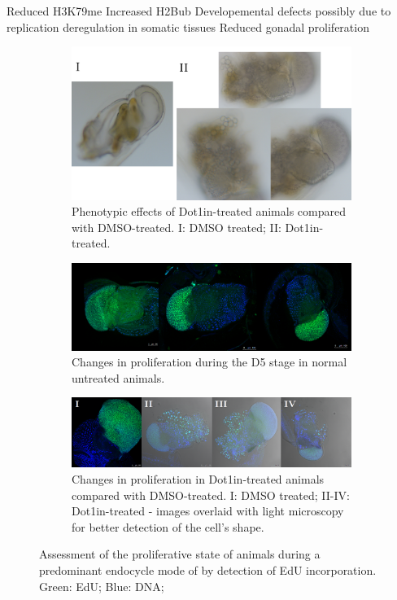 \documentclass[11pt,twoside,a4paper]{report}
\begin{document}
	Reduced H3K79me
	Increased H2Bub
	Developemental defects possibly due to replication deregulation in somatic tissues
	Reduced gonadal proliferation

	\begin{figure}
		\centering
		\begin{subfigure}{0.8\textwidth}
			\centering
			\includegraphics[width=1\linewidth]{pngs/d5_phenotype.png}
			\caption{
				Phenotypic effects of Dot1in-treated animals compared with DMSO-treated.
				{\footnotesize
					I: DMSO treated;
					II: Dot1in-treated.
				}
			}
		\end{subfigure}
		\begin{subfigure}{1\textwidth}
			\centering
			\includegraphics[width=1\linewidth]{pngs/d5_EdU.png}
			\caption{Changes in proliferation during the D5 stage in normal untreated animals.}
		\end{subfigure}
		\begin{subfigure}{1\textwidth}
			\centering
			\includegraphics[width=1\linewidth]{pngs/D5_EdU_dot1in.png}
			\caption{
				Changes in proliferation in Dot1in-treated animals compared with DMSO-treated.
				{\footnotesize
					I: DMSO treated;
					II-IV: Dot1in-treated - images overlaid with light microscopy for better detection of the cell's shape.
				}
			}
		\end{subfigure}
		\caption{Assessment of the proliferative state of animals during a predominant endocycle mode of by detection of EdU incorporation.
		Green: EdU;
		Blue: DNA;
		}
		\label{fig:Dot1in_D5}
	\end{figure}
\end{document}
